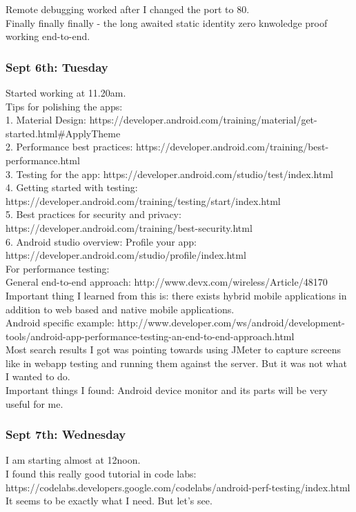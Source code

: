 \documentclass[11pt]{article}
\begin{document}
Remote debugging worked after I changed the port to 80.\\

Finally finally finally - the long awaited static identity zero knwoledge proof working end-to-end.\\

\subsubsection*{Sept 6th: Tuesday}
Started working at 11.20am.\\

Tips for polishing the apps: \\
1. Material Design: https://developer.android.com/training/material/get-started.html#ApplyTheme \\
2. Performance best practices: https://developer.android.com/training/best-performance.html\\
3. Testing for the app: https://developer.android.com/studio/test/index.html\\
4. Getting started with testing: https://developer.android.com/training/testing/start/index.html\\
5. Best practices for security and privacy: https://developer.android.com/training/best-security.html\\
6. Android studio overview: Profile your app: https://developer.android.com/studio/profile/index.html\\

For performance testing:\\
General end-to-end approach: http://www.devx.com/wireless/Article/48170\\
Important thing I learned from this is: there exists hybrid mobile applications in addition to web based and native mobile applications.\\

Android specific example: http://www.developer.com/ws/android/development-tools/android-app-performance-testing-an-end-to-end-approach.html\\

Most search results I got was pointing towards using JMeter to capture screens like in webapp testing and running them against the server. But it was 
not what I wanted to do.\\

Important things I found: Android device monitor and its parts will be very useful for me.

\subsubsection*{Sept 7th: Wednesday}
I am starting almost at 12noon.\\
I found this really good tutorial in code labs: https://codelabs.developers.google.com/codelabs/android-perf-testing/index.html\\
It seems to be exactly what I need. But let's see. \\
\end{document}
